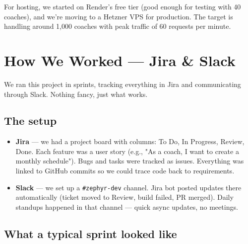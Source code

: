 \documentclass[11pt,a4paper]{article}
\begin{document}
For hosting, we started on Render's free tier (good enough for testing with 40 coaches), and we're moving to a Hetzner VPS for production. The target is handling around 1,000 coaches with peak traffic of 60 requests per minute.

\newpage

\section{How We Worked — Jira \& Slack}

We ran this project in sprints, tracking everything in Jira and communicating through Slack. Nothing fancy, just what works.

\subsection{The setup}

\begin{itemize}
  \item \textbf{Jira} — we had a project board with columns: To Do, In Progress, Review, Done. Each feature was a user story (e.g., "As a coach, I want to create a monthly schedule"). Bugs and tasks were tracked as issues. Everything was linked to GitHub commits so we could trace code back to requirements.
  \item \textbf{Slack} — we set up a \texttt{\#zephyr-dev} channel. Jira bot posted updates there automatically (ticket moved to Review, build failed, PR merged). Daily standups happened in that channel — quick async updates, no meetings.
\end{itemize}

\subsection{What a typical sprint looked like}
\end{document}
